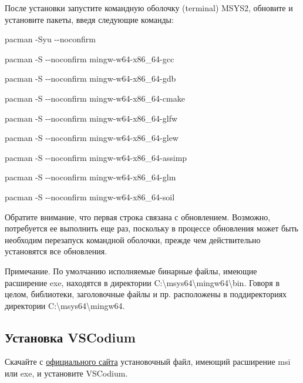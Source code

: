 \documentclass[a4paper,12pt]{article}
\renewenvironment{itemize}{
    \begin{list}{\labelitemi}{
    \setlength{\topsep}{0pt}
    \setlength{\partopsep}{6pt}
    \setlength{\parskip}{0pt}
    \setlength{\itemsep}{0pt}
    \setlength{\parsep}{0pt}
    }
}{\end{list}}
\begin{document}
        После установки запустите командную оболочку (terminal) MSYS2, обновите и установите пакеты, введя следующие команды:
        
        \begin{itemize}
            \item[] pacman -Syu {-}{-}noconfirm
            \item[] pacman -S {-}{-}noconfirm mingw-w64-x86\_64-gcc
            \item[] pacman -S {-}{-}noconfirm mingw-w64-x86\_64-gdb
            \item[] pacman -S {-}{-}noconfirm mingw-w64-x86\_64-cmake
            \item[] pacman -S {-}{-}noconfirm mingw-w64-x86\_64-glfw
            \item[] pacman -S {-}{-}noconfirm mingw-w64-x86\_64-glew
            \item[] pacman -S {-}{-}noconfirm mingw-w64-x86\_64-assimp
            \item[] pacman -S {-}{-}noconfirm mingw-w64-x86\_64-glm
            \item[] pacman -S {-}{-}noconfirm mingw-w64-x86\_64-soil

        \end{itemize}
                
        Обратите внимание, что первая строка связана с обновлением. Возможно, потребуется ее выполнить еще раз, поскольку в процессе обновления может быть необходим перезапуск командной оболочки, прежде чем действительно установятся все обновления.



        Примечание. 
        По умолчанию исполняемые бинарные файлы, имеющие расширение exe, находятся в директории \textquotedbl C:\textbackslash msys64\textbackslash mingw64\textbackslash bin\textquotedbl. Говоря в целом, библиотеки, заголовочные файлы и пр. расположены в поддиректориях директории \textquotedbl C:\textbackslash msys64\textbackslash mingw64\textquotedbl.

        \subsection{Установка VSCodium}
        
        Скачайте с \href{https://github.com/VSCodium/vscodium/releases/}{официального сайта} установочный файл, имеющий расширение msi или exe, и установите VSCodium.
\end{document}
